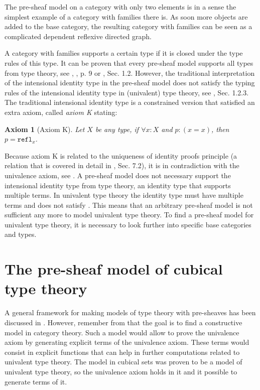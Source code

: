 \documentclass[12pt,a4paper,twoside,xetex]{book} %
\newcommand{\keyword}[1]{\emph{#1}\index{#1}}
\newtheorem{axiom}[theorem]{Axiom}
\newcommand{\op}[1]{\mathtt{#1}}
\begin{document}
The pre-sheaf model on a category with only two elements is in a sense the 
simplest example of a category with families there is. As soon more objects are 
added to the base category, the resulting category with families can be seen as 
a complicated dependent reflexive directed graph. 

A category with families supports a certain type if it is closed under the type 
rules of this type.  It can be proven that every pre-sheaf model supports all 
types from type theory, see \cite{Hofmann1997}, \cite{Nuyts2018}, p. 9 or 
\cite{Huber2016}, Sec. 1.2. However, the traditional interpretation of the 
intensional identity type in the pre-sheaf model does not satisfy the typing 
rules of the intensional identity type in (univalent) type theory, see 
\cite{Huber2016}, Sec. 1.2.3. The traditional intensional identity type is a 
constrained version that satisfied an extra axiom, called \keyword{axiom K} 
stating: 

\begin{axiom}[Axiom K]\label{axiomk}
Let $X$ be any type, if $\forall x : X$ and $p : (x = x)$, then $p = 
\op{refl}_x$.  
\end{axiom}

Because axiom K is related to the uniqueness of identity proofs principle (a 
relation that is covered in detail in \cite{Voevodsky2013}, Sec. 7.2), it is in 
contradiction with the univalence axiom, see . A pre-sheaf model 
does not necessary support the intensional identity type from type theory, an 
identity type that supports multiple terms. In univalent type theory the 
identity type must have multiple terms and does not satisfy . This 
means that an arbitrary pre-sheaf model is not sufficient any more to model univalent type theory. To find a pre-sheaf model for univalent type theory, it is 
necessary to look further into specific base categories and types.

\chapter{The pre-sheaf model of cubical type theory}\label{cubical}

A general framework for making models of type 
theory with pre-sheaves has been discussed in . However, remember from  that the goal is to find a constructive model in category theory. Such a model would allow to prove the univalence axiom by generating explicit terms of the univalence axiom. These terms would consist in explicit functions that can help in further computations related to univalent type theory. The model in cubical sets was proven to be a model of univalent type theory, so the univalence axiom holds in it and it possible to generate terms of it. 
\end{document}
